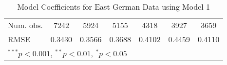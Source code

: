\begin{table}
\begin{center}
\begin{small}
\begin{tabular}{l c c c c c c }
Num. obs.       & 7242            & 5924            & 5155            & 4318            & 3927            & 3659            \\
RMSE            & 0.3430          & 0.3566          & 0.3688          & 0.4102          & 0.4459          & 0.4110          \\
\hline
\multicolumn{7}{l}{\tiny{$^{***}p<0.001$, $^{**}p<0.01$, $^*p<0.05$}}
\end{tabular}
\end{small}
\caption{Model Coefficients for East German Data using Model 1}
\label{table:EastModelsTotal}
\end{center}
\end{table}
